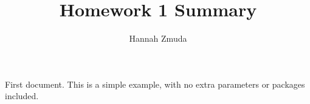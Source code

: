\documentclass{article}
\title{Homework 1 Summary}
\author{Hannah Zmuda}
\begin{document}
First document. This is a simple example, with no 
extra parameters or packages included.
\end{document}

